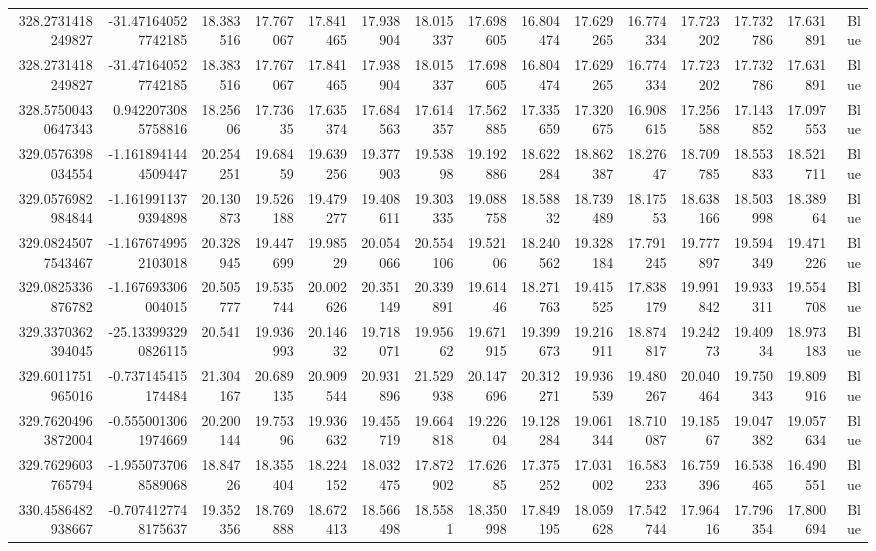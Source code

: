 \begin{center}
\begin{longtable}{rrrrrrrrrrrrrrr}
328.2731418249827 & -31.471640527742185 & 18.383516 & 17.767067 & 17.841465 & 17.938904 & 18.015337 & 17.698605 & 16.804474 & 17.629265 & 16.774334 & 17.723202 & 17.732786 & 17.631891 & Blue \\
328.2731418249827 & -31.471640527742185 & 18.383516 & 17.767067 & 17.841465 & 17.938904 & 18.015337 & 17.698605 & 16.804474 & 17.629265 & 16.774334 & 17.723202 & 17.732786 & 17.631891 & Blue \\
328.57500430647343 & 0.9422073085758816 & 18.25606 & 17.73635 & 17.635374 & 17.684563 & 17.614357 & 17.562885 & 17.335659 & 17.320675 & 16.908615 & 17.256588 & 17.143852 & 17.097553 & Blue \\
329.0576398034554 & -1.1618941444509447 & 20.254251 & 19.68459 & 19.639256 & 19.377903 & 19.53898 & 19.192886 & 18.622284 & 18.862387 & 18.27647 & 18.709785 & 18.553833 & 18.521711 & Blue \\
329.0576982984844 & -1.1619911379394898 & 20.130873 & 19.526188 & 19.479277 & 19.408611 & 19.303335 & 19.088758 & 18.58832 & 18.739489 & 18.17553 & 18.638166 & 18.503998 & 18.38964 & Blue \\
329.08245077543467 & -1.1676749952103018 & 20.328945 & 19.447699 & 19.98529 & 20.054066 & 20.554106 & 19.52106 & 18.240562 & 19.328184 & 17.791245 & 19.777897 & 19.594349 & 19.471226 & Blue \\
329.0825336876782 & -1.167693306004015 & 20.505777 & 19.535744 & 20.002626 & 20.351149 & 20.339891 & 19.61446 & 18.271763 & 19.415525 & 17.838179 & 19.991842 & 19.933311 & 19.554708 & Blue \\
329.3370362394045 & -25.133993290826115 & 20.541 & 19.936993 & 20.14632 & 19.718071 & 19.95662 & 19.671915 & 19.399673 & 19.216911 & 18.874817 & 19.24273 & 19.40934 & 18.973183 & Blue \\
329.6011751965016 & -0.737145415174484 & 21.304167 & 20.689135 & 20.909544 & 20.931896 & 21.529938 & 20.147696 & 20.312271 & 19.936539 & 19.480267 & 20.040464 & 19.750343 & 19.809916 & Blue \\
329.76204963872004 & -0.5550013061974669 & 20.200144 & 19.75396 & 19.936632 & 19.455719 & 19.664818 & 19.22604 & 19.128284 & 19.061344 & 18.710087 & 19.18567 & 19.047382 & 19.057634 & Blue \\
329.7629603765794 & -1.9550737068589068 & 18.84726 & 18.355404 & 18.224152 & 18.032475 & 17.872902 & 17.62685 & 17.375252 & 17.031002 & 16.583233 & 16.759396 & 16.538465 & 16.490551 & Blue \\
330.4586482938667 & -0.7074127748175637 & 19.352356 & 18.769888 & 18.672413 & 18.566498 & 18.5581 & 18.350998 & 17.849195 & 18.059628 & 17.542744 & 17.96416 & 17.796354 & 17.800694 & Blue \\

\end{longtable}
\end{center}
